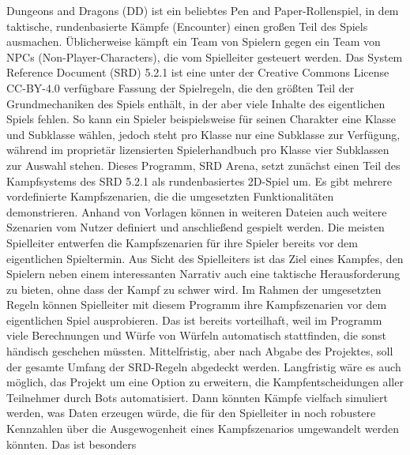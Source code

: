 \markdownRendererDocumentBegin
\markdownRendererSectionBegin
\markdownRendererSectionBegin
{}\markdownRendererInterblockSeparator
{}Dungeons and Dragons (D\markdownRendererAmpersand{}D) ist ein beliebtes Pen and Paper-Rollenspiel, in dem taktische, rundenbasierte Kämpfe (Encounter) einen großen Teil des Spiels ausmachen. Üblicherweise kämpft ein Team von Spielern gegen ein Team von NPCs (Non-Player-Characters), die vom Spielleiter gesteuert werden.\markdownRendererSoftLineBreak
{}Das System Reference Document (SRD) 5.2.1 ist eine unter der Creative Commons License CC-BY-4.0 verfügbare Fassung der Spielregeln, die den größten Teil der Grundmechaniken des Spiels enthält, in der aber viele Inhalte des eigentlichen Spiels fehlen. So kann ein Spieler beispielsweise für seinen Charakter eine Klasse und Subklasse wählen, jedoch steht pro Klasse nur eine Subklasse zur Verfügung, während im proprietär lizensierten Spielerhandbuch pro Klasse vier Subklassen zur Auswahl stehen.\markdownRendererSoftLineBreak
{}Dieses Programm, SRD Arena, setzt zunächst einen Teil des Kampfsystems des SRD 5.2.1 als rundenbasiertes 2D-Spiel um. Es gibt mehrere vordefinierte Kampfszenarien, die die umgesetzten Funktionalitäten demonstrieren. Anhand von Vorlagen können in weiteren Dateien auch weitere Szenarien vom Nutzer definiert und anschließend gespielt werden.\markdownRendererInterblockSeparator
{}\markdownRendererSectionBegin
{}\markdownRendererInterblockSeparator
{}Die meisten Spielleiter entwerfen die Kampfszenarien für ihre Spieler bereits vor dem eigentlichen Spieltermin. Aus Sicht des Spielleiters ist das Ziel eines Kampfes, den Spielern neben einem interessanten Narrativ auch eine taktische Herausforderung zu bieten, ohne dass der Kampf zu schwer wird.\markdownRendererSoftLineBreak
{}Im Rahmen der umgesetzten Regeln können Spielleiter mit diesem Programm ihre Kampfszenarien vor dem eigentlichen Spiel ausprobieren. Das ist bereits vorteilhaft, weil im Programm viele Berechnungen und Würfe von Würfeln automatisch stattfinden, die sonst händisch geschehen müssten. Mittelfristig, aber nach Abgabe des Projektes, soll der gesamte Umfang der SRD-Regeln abgedeckt werden.\markdownRendererParagraphSeparator
{}Langfristig wäre es auch möglich, das Projekt um eine Option zu erweitern, die Kampfentscheidungen aller Teilnehmer durch Bots automatisiert. Dann könnten Kämpfe vielfach simuliert werden, was Daten erzeugen würde, die für den Spielleiter in noch robustere Kennzahlen über die Ausgewogenheit eines Kampfszenarios umgewandelt werden könnten. Das ist besonders\markdownRendererSoftLineBreak
